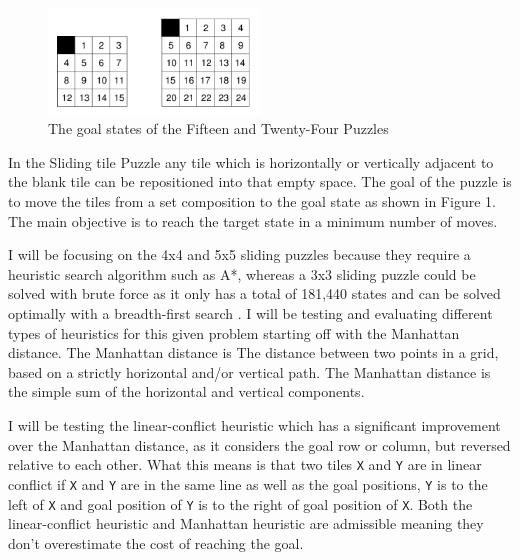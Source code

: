 \documentclass[proposal]{cmpreport}
\begin{document}
\begin{figure}[ht]
	\centering
	\includegraphics[width=0.5\textwidth]{sliding_tile}
	\captionsetup{justification=centering}
	\caption{The goal states of the Fifteen and Twenty-Four Puzzles}
\end{figure}

	In the Sliding tile Puzzle any tile which is horizontally or vertically adjacent to the blank tile can be repositioned into that empty space. The goal of the puzzle is to move the tiles from a set composition to the goal state as shown in Figure 1. The main objective is to reach the target state in a minimum number of moves. 
	
	I will be focusing on the 4x4 and 5x5 sliding puzzles because they require a heuristic search algorithm such as A*, whereas a 3x3 sliding puzzle could be solved with brute force as it only has a total of 181,440 states and can be solved optimally with a breadth-first search \cite{DBLP:journals/ai/KorfF02}. I will be testing and evaluating different types of heuristics for this given problem starting off with the Manhattan distance. The Manhattan distance is The distance between two points in a grid, based on a strictly horizontal and/or vertical path. The Manhattan distance is the simple sum of the horizontal and vertical components.
	
	I will be testing the linear-conflict heuristic which has a significant improvement over the Manhattan distance, as it considers the goal row or column, but reversed relative to each other. What this means is that two tiles \verb/X/ and \verb/Y/ are in linear conflict if \verb/X/ and \verb/Y/ are in the same line as well as the goal positions, \verb/Y/ is to the left of \verb/X/ and goal position of \verb/Y/ is to the right of goal position of \verb/X/. Both the linear-conflict heuristic and Manhattan heuristic are admissible meaning they don't overestimate the cost of reaching the goal. 
\end{document}
